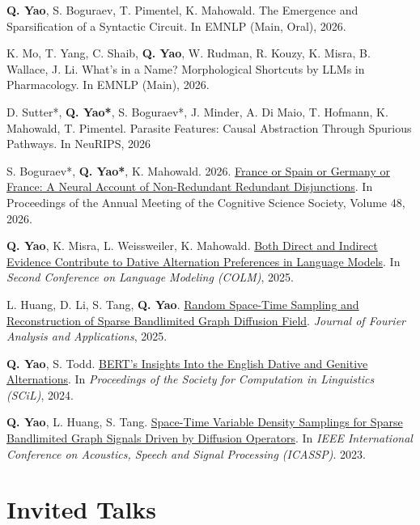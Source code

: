 \documentclass[11pt, letterpaper]{article}
\begin{document}
\begin{etaremune}
\item \textbf{Q. Yao}, S. Boguraev, T. Pimentel, K. Mahowald. The Emergence and Sparsification of a Syntactic Circuit. In EMNLP (Main, Oral), 2026.
\item K. Mo, T. Yang, C. Shaib, \textbf{Q. Yao}, W. Rudman, R. Kouzy, K. Misra, B. Wallace, J. Li. What's in a Name? Morphological Shortcuts by LLMs in Pharmacology. In EMNLP (Main), 2026.
\item D. Sutter*, \textbf{Q. Yao*}, S. Boguraev*, J. Minder, A. Di Maio, T. Hofmann, K. Mahowald, T. Pimentel. Parasite Features: Causal Abstraction Through Spurious Pathways. In NeuRIPS, 2026
\item S. Boguraev*, \textbf{Q. Yao*}, K. Mahowald. 2026. \href{https://arxiv.org/pdf/2602.23547}{France or Spain or Germany or France: A Neural Account of Non-Redundant Redundant Disjunctions}. In Proceedings of the Annual Meeting of the Cognitive Science Society, Volume 48, 2026.
  \item \textbf{Q. Yao}, K. Misra, L. Weissweiler, K. Mahowald.
    \href{https://arxiv.org/abs/2503.20850}{Both Direct and Indirect Evidence Contribute to Dative Alternation Preferences in Language Models}.
    In \textit{Second Conference on Language Modeling (COLM)}, 2025.

  \item L. Huang, D. Li, S. Tang, \textbf{Q. Yao}.
    \href{https://link.springer.com/article/10.1007/s00041-025-10177-4}{Random Space-Time Sampling and Reconstruction of Sparse Bandlimited Graph Diffusion Field}.
    \textit{Journal of Fourier Analysis and Applications}, 2025.

  \item \textbf{Q. Yao}, S. Todd.
    \href{https://aclanthology.org/2024.scil-1.6.pdf}{BERT's Insights Into the English Dative and Genitive Alternations}.
    In \textit{Proceedings of the Society for Computation in Linguistics (SCiL)}, 2024.

  \item \textbf{Q. Yao}, L. Huang, S. Tang.
    \href{https://ieeexplore.ieee.org/abstract/document/10095406}{Space-Time Variable Density Samplings for Sparse Bandlimited Graph Signals Driven by Diffusion Operators}.
    In \textit{IEEE International Conference on Acoustics, Speech and Signal Processing (ICASSP)}. 2023.
\end{etaremune}

\section*{Invited Talks}
\end{document}
